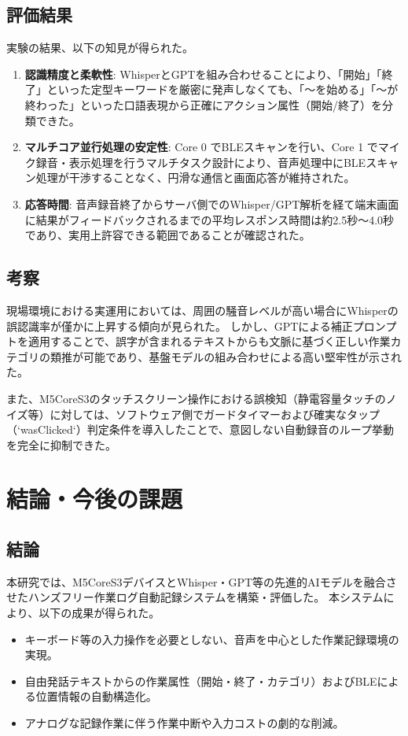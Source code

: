 \documentclass[a4paper,12pt,ja=standard,lualatex]{bxjsarticle}
\begin{document}
\subsection{評価結果}
実験の結果、以下の知見が得られた。

\begin{enumerate}
    \item \textbf{認識精度と柔軟性}: WhisperとGPTを組み合わせることにより、「開始」「終了」といった定型キーワードを厳密に発声しなくても、「～を始める」「～が終わった」といった口語表現から正確にアクション属性（開始/終了）を分類できた。
    \item \textbf{マルチコア並行処理の安定性}: Core 0 でBLEスキャンを行い、Core 1 でマイク録音・表示処理を行うマルチタスク設計により、音声処理中にBLEスキャン処理が干渉することなく、円滑な通信と画面応答が維持された。
    \item \textbf{応答時間}: 音声録音終了からサーバ側でのWhisper/GPT解析を経て端末画面に結果がフィードバックされるまでの平均レスポンス時間は約2.5秒～4.0秒であり、実用上許容できる範囲であることが確認された。
\end{enumerate}

\subsection{考察}
現場環境における実運用においては、周囲の騒音レベルが高い場合にWhisperの誤認識率が僅かに上昇する傾向が見られた。
しかし、GPTによる補正プロンプトを適用することで、誤字が含まれるテキストからも文脈に基づく正しい作業カテゴリの類推が可能であり、基盤モデルの組み合わせによる高い堅牢性が示された。

また、M5CoreS3のタッチスクリーン操作における誤検知（静電容量タッチのノイズ等）に対しては、ソフトウェア側でガードタイマーおよび確実なタップ（`wasClicked`）判定条件を導入したことで、意図しない自動録音のループ挙動を完全に抑制できた。

\newpage

\section{結論・今後の課題}\label{sec5}

\subsection{結論}
本研究では、M5CoreS3デバイスとWhisper・GPT等の先進的AIモデルを融合させたハンズフリー作業ログ自動記録システムを構築・評価した。
本システムにより、以下の成果が得られた。
\begin{itemize}
    \item キーボード等の入力操作を必要としない、音声を中心とした作業記録環境の実現。
    \item 自由発話テキストからの作業属性（開始・終了・カテゴリ）およびBLEによる位置情報の自動構造化。
    \item アナログな記録作業に伴う作業中断や入力コストの劇的な削減。
\end{itemize}
\end{document}
